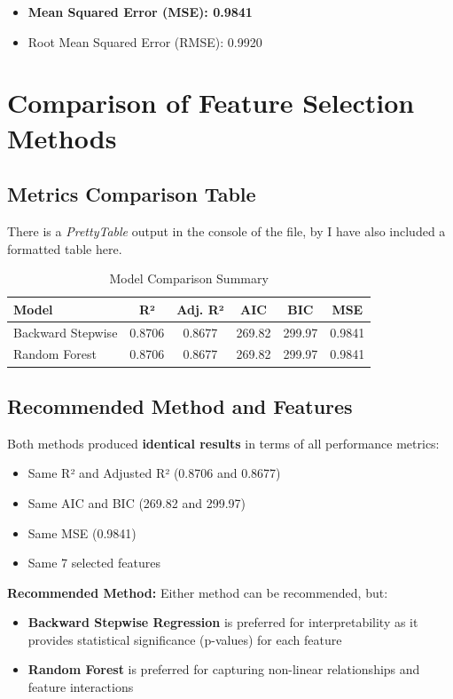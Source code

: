 \documentclass[12pt]{article}
\begin{document}
\begin{itemize}
    \item \textbf{Mean Squared Error (MSE): 0.9841}
    \item Root Mean Squared Error (RMSE): 0.9920
\end{itemize}

\section{Comparison of Feature Selection Methods}

\subsection{Metrics Comparison Table}

There is a \textit{PrettyTable} output in the console of the file, by I have also included a formatted table here.

\begin{table}[H]
\centering
\caption{Model Comparison Summary}
\begin{tabular}{lccccc}
\toprule
\textbf{Model} & \textbf{R²} & \textbf{Adj. R²} & \textbf{AIC} & \textbf{BIC} & \textbf{MSE} \\
\midrule
Backward Stepwise & 0.8706 & 0.8677 & 269.82 & 299.97 & 0.9841 \\
Random Forest & 0.8706 & 0.8677 & 269.82 & 299.97 & 0.9841 \\
\bottomrule
\end{tabular}
\end{table}

\subsection{Recommended Method and Features}

\newpage
Both methods produced \textbf{identical results} in terms of all performance metrics:
\begin{itemize}
    \item Same R² and Adjusted R² (0.8706 and 0.8677)
    \item Same AIC and BIC (269.82 and 299.97)
    \item Same MSE (0.9841)
    \item Same 7 selected features
\end{itemize}

\textbf{Recommended Method:} Either method can be recommended, but:
\begin{itemize}
    \item \textbf{Backward Stepwise Regression} is preferred for interpretability as it provides statistical significance (p-values) for each feature
    \item \textbf{Random Forest} is preferred for capturing non-linear relationships and feature interactions
\end{itemize}
\end{document}
